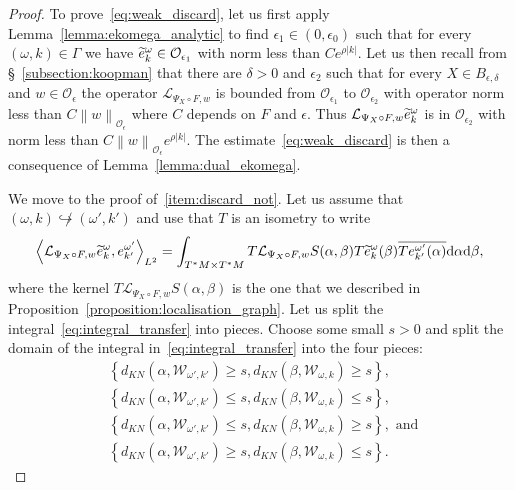 \documentclass[AHL,Unicode,longabstracts,published]{cedram}
\newcommand{\set}[1]{\left\{ #1 \right\}}
\newcommand{\n}[1]{\left\|#1\right\|}
\newcommand{\va}[1]{\left|#1\right|}
\newcommand{\clO}{\mathcal{O}}
\newcommand{\clL}{\mathcal{L}}
\newcommand{\clW}{\mathcal{W}}
\newcommand{\rmd}{\mathrm{d}}
\let\oldtilde\tilde
\renewcommand*{\tilde}[1]{\mathchoice{\widetilde{#1}}{\widetilde{#1}}{\oldtilde{#1}}{\oldtilde{#1}}}
\newcommand{\clO}{\mathcal{O}}
\begin{document}
\begin{proof}
To prove~\eqref{eq:weak_discard}, let us first apply Lemma~\ref{lemma:ekomega_analytic} to find $\epsilon_1 \in (0,\epsilon_0)$ such that for every $(\omega,k) \in \Gamma$ we have $\tilde{e}_{k}^{\omega} \in \clO_{\epsilon_1}$ with norm less than $C e^{\rho \va{k}}$. Let us then recall from \S~\ref{subsection:koopman} that there are $\delta > 0$ and $\epsilon_2$ such that for every $X \in B_{\epsilon,\delta}$ and $w \in \clO_\epsilon$ the operator $\clL_{\Psi_X \circ F,w}$ is bounded from $\clO_{\epsilon_1}$ to $\clO_{\epsilon_2}$ with operator norm less than $C \n{w}_{\clO_\epsilon}$ where $C$ depends on $F$ and $\epsilon$. Thus $\clL_{\Psi_X \circ F,w} \tilde{e}_{k}^{\omega}$ is in $\clO_{\epsilon_2}$ with norm less than $C \n{w}_{\clO_\epsilon} e^{\rho \va{k}}$. The estimate~\eqref{eq:weak_discard} is then a consequence of Lemma~\ref{lemma:dual_ekomega}.

We move to the proof of~\eqref{item:discard_not}. Let us assume that $(\omega,k) \not\hookrightarrow (\omega',k')$ and use that $T$ is an isometry to write
\begin{equation}\label{eq:integral_transfer}
\left\langle \clL_{\Psi_X \circ F,w} \tilde{e}_{k}^{\omega}, e_{k'}^{\omega'} \right\rangle_{L^2} = \int_{T^* M \times T^* M} T \clL_{\Psi_X \circ F,w} S(\alpha,\beta) T \tilde{e}_{k}^{\omega} (\beta) \overline{ T e_{k'}^{\omega'}(\alpha)} \rmd \alpha \rmd \beta,
\end{equation}
where the kernel $T \clL_{\Psi_X \circ F,w}S(\alpha,\beta)$ is the one that we described in Proposition~\ref{proposition:localisation_graph}. Let us split the integral~\eqref{eq:integral_transfer} into pieces. Choose some small $s > 0$ and split the domain of the integral in~\eqref{eq:integral_transfer} into the four pieces:
\begin{equation}\label{eq:integral_transfer_split}
\begin{split}
&\set{d_{KN}(\alpha, \clW_{\omega',k'}) \geq s, d_{KN}(\beta,\clW_{\omega,k})\geq s}, \\
& \set{d_{KN}(\alpha, \clW_{\omega',k'}) \leq s, d_{KN}(\beta,\clW_{\omega,k})\leq s}, \\
& \set{d_{KN}(\alpha, \clW_{\omega',k'}) \leq s, d_{KN}(\beta,\clW_{\omega,k})\geq s}, \text{ and }\\ & \set{d_{KN}(\alpha, \clW_{\omega',k'}) \geq s, d_{KN}(\beta,\clW_{\omega,k})\leq s}.
\end{split}
\end{equation}


\end{proof}
\end{document}
